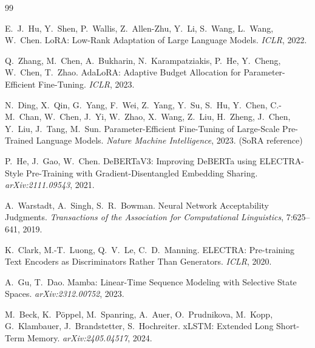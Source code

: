 \documentclass[12pt,a4paper]{article}
\theoremstyle{definition}
\begin{document}
\begin{thebibliography}{99}

E.~J.~Hu, Y.~Shen, P.~Wallis, Z.~Allen-Zhu, Y.~Li, S.~Wang, L.~Wang, W.~Chen.
\newblock LoRA: Low-Rank Adaptation of Large Language Models.
\newblock \textit{ICLR}, 2022.

Q.~Zhang, M.~Chen, A.~Bukharin, N.~Karampatziakis, P.~He, Y.~Cheng, W.~Chen, T.~Zhao.
\newblock AdaLoRA: Adaptive Budget Allocation for Parameter-Efficient Fine-Tuning.
\newblock \textit{ICLR}, 2023.

N.~Ding, X.~Qin, G.~Yang, F.~Wei, Z.~Yang, Y.~Su, S.~Hu, Y.~Chen, C.-M.~Chan, W.~Chen, J.~Yi, W.~Zhao, X.~Wang, Z.~Liu, H.~Zheng, J.~Chen, Y.~Liu, J.~Tang, M.~Sun.
\newblock Parameter-Efficient Fine-Tuning of Large-Scale Pre-Trained Language Models.
\newblock \textit{Nature Machine Intelligence}, 2023. (SoRA reference)

P.~He, J.~Gao, W.~Chen.
\newblock DeBERTaV3: Improving DeBERTa using ELECTRA-Style Pre-Training with Gradient-Disentangled Embedding Sharing.
\newblock \textit{arXiv:2111.09543}, 2021.

A.~Warstadt, A.~Singh, S.~R.~Bowman.
\newblock Neural Network Acceptability Judgments.
\newblock \textit{Transactions of the Association for Computational Linguistics}, 7:625--641, 2019.

K.~Clark, M.-T.~Luong, Q.~V.~Le, C.~D.~Manning.
\newblock ELECTRA: Pre-training Text Encoders as Discriminators Rather Than Generators.
\newblock \textit{ICLR}, 2020.

A.~Gu, T.~Dao.
\newblock Mamba: Linear-Time Sequence Modeling with Selective State Spaces.
\newblock \textit{arXiv:2312.00752}, 2023.

M.~Beck, K.~P{\"o}ppel, M.~Spanring, A.~Auer, O.~Prudnikova, M.~Kopp, G.~Klambauer, J.~Brandstetter, S.~Hochreiter.
\newblock xLSTM: Extended Long Short-Term Memory.
\newblock \textit{arXiv:2405.04517}, 2024.

\end{thebibliography}
\end{document}
